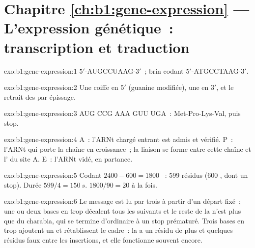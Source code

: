 \section*{Chapitre \ref{ch:b1:gene-expression} --- L'expression génétique~: transcription et traduction}

\begin{solution}{exo:b1:gene-expression:1}
 $5'$-AUGCCUAAG-$3'$~; brin codant $5'$-ATGCCTAAG-$3'$.
\end{solution}

\begin{solution}{exo:b1:gene-expression:2}
Une coiffe en $5'$ (guanine modifiée), une  en $3'$, et le
retrait des  par épissage.
\end{solution}

\begin{solution}{exo:b1:gene-expression:3}
AUG CCG AAA GUU UGA~: Met-Pro-Lys-Val, puis stop.
\end{solution}

\begin{solution}{exo:b1:gene-expression:4}
A~: l'ARNt chargé entrant est admis et vérifié. P~: l'ARNt qui porte la
chaîne en croissance~; la liaison se forme entre cette chaîne et l' du site A. E~: l'ARNt vidé, en partance.
\end{solution}

\begin{solution}{exo:b1:gene-expression:5}
Codant $2400 - 600 = 1800$ ~: 599 résidus (600 , dont
un stop). Durée $599/4 = \qty{150}{s}$.  $1800/90 = 20$ à la
fois.
\end{solution}

\begin{solution}{exo:b1:gene-expression:6}
Le message est lu par trois à partir d'un départ fixé~; une ou deux
bases en trop décalent tous les  suivants et le reste de la
 n'est plus que du charabia, qui se termine d'ordinaire à un
stop prématuré. Trois bases en trop ajoutent un  et rétablissent le
cadre~: la  a un résidu de plus et quelques résidus faux entre
les insertions, et elle fonctionne souvent encore.
\end{solution}

